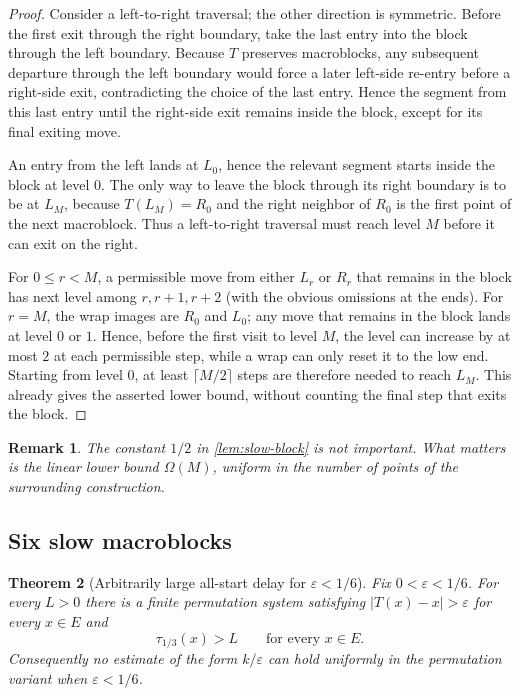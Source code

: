 \documentclass[11pt]{article}
\newtheorem{theorem}{Theorem}[section]
\newtheorem{remark}[theorem]{Remark}
\newcommand{\eps}{\varepsilon}
\begin{document}
\begin{proof}
Consider a left-to-right traversal; the other direction is symmetric. Before the first exit through the right boundary, take the last entry into the block through the left boundary. Because $T$ preserves macroblocks, any subsequent departure through the left boundary would force a later left-side re-entry before a right-side exit, contradicting the choice of the last entry. Hence the segment from this last entry until the right-side exit remains inside the block, except for its final exiting move.

An entry from the left lands at $L_0$, hence the relevant segment starts inside the block at level $0$. The only way to leave the block through its right boundary is to be at $L_M$, because $T(L_M)=R_0$ and the right neighbor of $R_0$ is the first point of the next macroblock. Thus a left-to-right traversal must reach level $M$ before it can exit on the right.

For $0\le r<M$, a permissible move from either $L_r$ or $R_r$ that remains in the block has next level among $r,r+1,r+2$ (with the obvious omissions at the ends). For $r=M$, the wrap images are $R_0$ and $L_0$; any move that remains in the block lands at level $0$ or $1$. Hence, before the first visit to level $M$, the level can increase by at most $2$ at each permissible step, while a wrap can only reset it to the low end. Starting from level $0$, at least $\lceil M/2\rceil$ steps are therefore needed to reach $L_M$. This already gives the asserted lower bound, without counting the final step that exits the block.
\end{proof}

\begin{remark}
The constant $1/2$ in \cref{lem:slow-block} is not important. What matters is the linear lower bound $\Omega(M)$, uniform in the number of points of the surrounding construction.
\end{remark}

\subsection{Six slow macroblocks}

\begin{theorem}[Arbitrarily large all-start delay for $\eps<1/6$]\label{thm:perm-lower}
Fix $0<\eps<1/6$. For every $L>0$ there is a finite permutation system satisfying $|T(x)-x|>\eps$ for every $x\in E$ and
\[
\tau_{1/3}(x)>L
\qquad\text{for every }x\in E.
\]
Consequently no estimate of the form $k/\eps$ can hold uniformly in the permutation variant when $\eps<1/6$.
\end{theorem}
\end{document}
